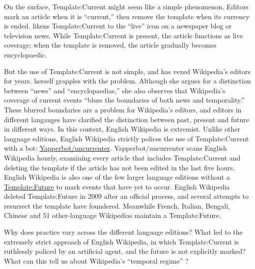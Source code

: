 \documentclass[Royal,times,sageh]{sagej}
\begin{document}
On the surface, Template:Current might seem like a simple phenomenon.
Editors mark an article when it is ``current,'' then remove the template
when its currency is ended. \citet{avieson_breaking_2019} likens
Template:Current to the ``live'' icon on a newspaper blog or television
news. While Template:Current is present, the article functions as live
coverage; when the template is removed, the article gradually becomes
encyclopaedic.

But the use of Template:Current is not simple, and has vexed Wikipedia's
editors for years. \citet{avieson_breaking_2019} herself grapples with
the problem. Although she argues for a distinction between ``news'' and
``encyclopaedias,'' she also observes that Wikipedia's coverage of
current events ``blurs the boundaries of both news and temporality.''
These blurred boundaries are a problem for Wikipedia's editors, and
editors in different langauges have clarified the distinction between
past, present and future in different ways. In this context, English
Wikipedia is extremist. Unlike other language editions, English
Wikipedia strictly polices the use of Template:Current with a bot:
\href{https://en.wikipedia.org/wiki/User:Yapperbot}{Yapperbot/uncurrenter}.
Yapperbot/uncurrenter scans English Wikipedia hourly, examining every
article that includes Template:Current and deleting the template if the
article has not been edited in the last five hours. English Wikipedia is
also one of the few larger language editions without a
\href{https://wikipedia.org/wiki/Template:Future}{Template:Future} to
mark events that have yet to occur. English Wikipedia deleted
Template:Future in 2009 after an official process, and several attempts
to resurrect the template have foundered. Meanwhile French, Italian,
Bengali, Chinese and 51 other-language Wikipedias maintain a
Template:Future.

Why does practice vary across the different language editions? What led
to the extremely strict approach of English Wikipedia, in which
Template:Current is ruthlessly policed by an artificial agent, and the
future is not explicitly marked? What can this tell us about Wikipedia's
``temporal regime'' \citep{assmann_is_2020}?
\end{document}
